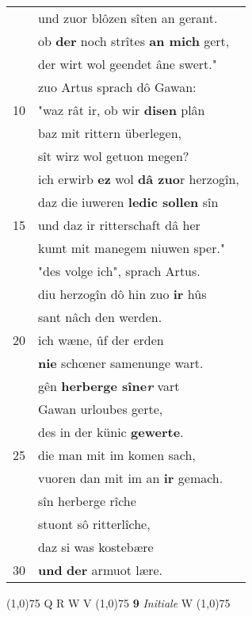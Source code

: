 \documentclass[8pt,a4paper,notitlepage]{article}
\begin{document}
\begin{table}[ht]
\begin{minipage}[t]{0.5\linewidth}
\begin{tabular}{rl}
 & und zuor blôzen sîten an gerant.\\ 
 & ob \textbf{der} noch strîtes \textbf{an mich} gert,\\ 
 & der wirt wol geendet âne swert."\\ 
 & zuo Artus sprach dô Gawan:\\ 
10 & "waz rât ir, ob wir \textbf{disen} plân\\ 
 & baz mit rittern überlegen,\\ 
 & sît wirz wol getuon megen?\\ 
 & ich erwirb \textbf{ez} wol \textbf{dâ zuo}r herzogîn,\\ 
 & daz die iuweren \textbf{ledic sollen} sîn\\ 
15 & und daz ir ritterschaft dâ her\\ 
 & kumt mit manegem niuwen sper."\\ 
 & "des volge ich", sprach Artus.\\ 
 & diu herzogîn dô hin zuo \textbf{ir} hûs\\ 
 & sant nâch den werden.\\ 
20 & ich wæne, ûf der erden\\ 
 & \textbf{nie} schœner samenunge wart.\\ 
 & gên \textbf{herberge sîne\textit{r}} vart\\ 
 & Gawan urloubes gerte,\\ 
 & des in der künic \textbf{gewerte}.\\ 
25 & die man mit im komen sach,\\ 
 & vuoren dan mit im an \textbf{ir} gemach.\\ 
 & sîn herberge rîche\\ 
 & stuont sô ritterlîche,\\ 
 & daz si was kostebære\\ 
30 & \textbf{und} \textbf{der} armuot lære.\\ 
\end{tabular}
\scriptsize
\line(1,0){75} \newline
Q R W V \newline
\line(1,0){75} \newline
\textbf{9} \textit{Initiale} W  \newline
\line(1,0){75} \newline

\end{minipage}
\end{table}
\end{document}
